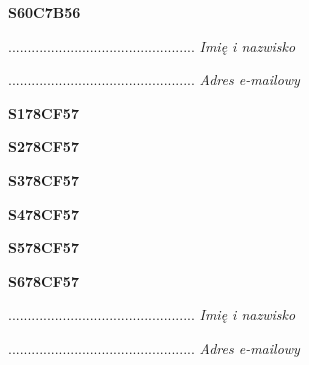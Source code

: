 \begin{turn}{90}\huge \textbf{S60C7B56}\end{turn}

\begin{turn}{90}\begin{minipage}{\linewidth} \vspace{20mm} ................................................  \textit{Imię i nazwisko}\end{minipage}\end{turn}

\begin{turn}{90}\begin{minipage}{\linewidth} \vspace{20mm} ................................................  \textit{Adres e-mailowy}\end{minipage}\end{turn}

\begin{turn}{90}\huge \textbf{S178CF57}\end{turn}

\begin{turn}{90}\huge \textbf{S278CF57}\end{turn}

\begin{turn}{90}\huge \textbf{S378CF57}\end{turn}

\begin{turn}{90}\huge \textbf{S478CF57}\end{turn}

\begin{turn}{90}\huge \textbf{S578CF57}\end{turn}

\begin{turn}{90}\huge \textbf{S678CF57}\end{turn}

\begin{turn}{90}\begin{minipage}{\linewidth} \vspace{20mm} ................................................  \textit{Imię i nazwisko}\end{minipage}\end{turn}

\begin{turn}{90}\begin{minipage}{\linewidth} \vspace{20mm} ................................................  \textit{Adres e-mailowy}\end{minipage}\end{turn}

